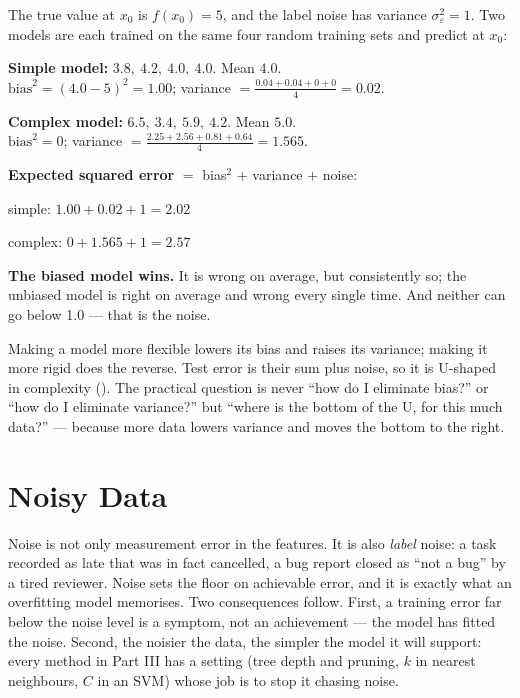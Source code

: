 \begin{worked}
The true value at $x_0$ is $f(x_0) = 5$, and the label noise has variance
$\sigma^2_\varepsilon = 1$. Two models are each trained on the same four random
training sets and predict at $x_0$:
\begin{tight}
  \item \textbf{Simple model:} $3.8,\ 4.2,\ 4.0,\ 4.0$. Mean $4.0$.\\
        $\text{bias}^2 = (4.0 - 5)^2 = 1.00$;\quad
        variance $= \tfrac{0.04 + 0.04 + 0 + 0}{4} = 0.02$.
  \item \textbf{Complex model:} $6.5,\ 3.4,\ 5.9,\ 4.2$. Mean $5.0$.\\
        $\text{bias}^2 = 0$;\quad
        variance $= \tfrac{2.25 + 2.56 + 0.81 + 0.64}{4} = 1.565$.
\end{tight}
\textbf{Expected squared error} $=$ bias$^2$ $+$ variance $+$ noise:
\begin{tight}
  \item simple: $1.00 + 0.02 + 1 = \mathbf{2.02}$
  \item complex: $0 + 1.565 + 1 = \mathbf{2.57}$
\end{tight}
\smallskip
\textbf{The biased model wins.} It is wrong on average, but consistently so; the
unbiased model is right on average and wrong every single time. And neither can
go below 1.0 --- that is the noise.
\end{worked}

\begin{conceptbox}
Making a model more flexible lowers its bias and raises its variance; making it
more rigid does the reverse. Test error is their sum plus noise, so it is
U-shaped in complexity (). The practical question is never
``how do I eliminate bias?'' or ``how do I eliminate variance?'' but ``where is the
bottom of the U, for this much data?'' --- because more data lowers variance and
moves the bottom to the right.
\end{conceptbox}

\section{Noisy Data}

Noise is not only measurement error in the features. It is also \emph{label}
noise: a task recorded as late that was in fact cancelled, a bug report closed as
``not a bug'' by a tired reviewer. Noise sets the floor on achievable error,
and it is exactly what an overfitting model memorises. Two consequences follow.
First, a training error far below the noise level is a symptom, not an
achievement --- the model has fitted the noise. Second, the noisier the data, the
simpler the model it will support: every method in Part III has a setting (tree
depth and pruning, $k$ in nearest neighbours, $C$ in an SVM) whose job is to stop
it chasing noise.

